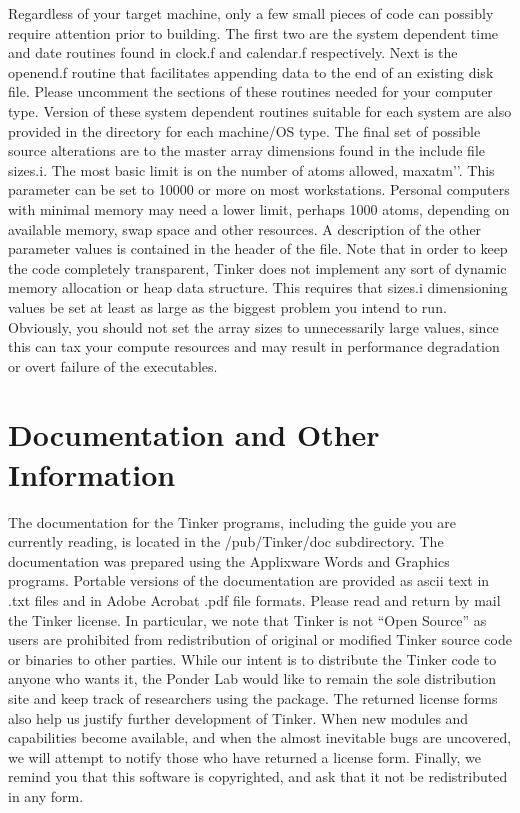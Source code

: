 \documentclass[letterpaper,11pt,english]{sphinxmanual}
\begin{document}
Regardless of your target machine, only a few small pieces of code can possibly require attention prior to building. The first two are the system dependent time and date routines found in clock.f and calendar.f respectively. Next is the openend.f routine that facilitates appending data to the end of an existing disk file. Please uncomment the sections of these routines needed for your computer type. Version of these system dependent routines suitable for each system are also provided in the directory for each machine/OS type. The final set of possible source alterations are to the master array dimensions found in the include file sizes.i. The most basic limit is on the number of atoms allowed, {\color{red}\bfseries{}\textasciigrave{}\textasciigrave{}}maxatm’’. This parameter can be set to 10000 or more on most workstations. Personal computers with minimal memory may need a lower limit, perhaps 1000 atoms, depending on available memory, swap space and other resources. A description of the other parameter values is contained in the header of the file. Note that in order to keep the code completely transparent, Tinker does not implement any sort of dynamic memory allocation or heap data structure. This requires that sizes.i dimensioning values be set at least as large as the biggest problem you intend to run. Obviously, you should not set the array sizes to unnecessarily large values, since this can tax your compute resources and may result in performance degradation or overt failure of the executables.


\section{Documentation and Other Information}
\label{\detokenize{text/installation:documentation-and-other-information}}
The documentation for the Tinker programs, including the guide you are currently reading, is located in the /pub/Tinker/doc subdirectory. The documentation was prepared using the Applixware Words and Graphics programs. Portable versions of the documentation are provided as ascii text in .txt files and in Adobe Acrobat .pdf file formats. Please read and return by mail the Tinker license. In particular, we note that Tinker is not “Open Source” as users are prohibited from redistribution of original or modified Tinker source code or binaries to other parties. While our intent is to distribute the Tinker code to anyone who wants it, the Ponder Lab would like to remain the sole distribution site and keep track of researchers using the package. The returned license forms also help us justify further development of Tinker. When new modules and capabilities become available, and when the almost inevitable bugs are uncovered, we will attempt to notify those who have returned a license form. Finally, we remind you that this software is copyrighted, and ask that it not be redistributed in any form.
\end{document}
